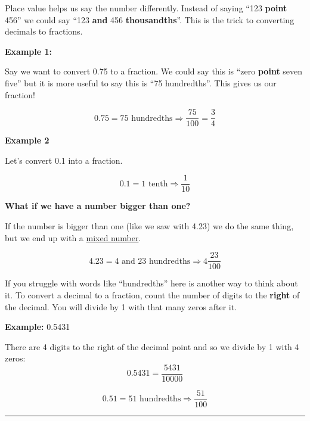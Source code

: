 \documentclass[
  letterpaper,
  DIV=11,
  numbers=noendperiod]{scrreprt}
\begin{document}
Place value helps us say the number differently. Instead of saying ``123
\textbf{point} 456'' we could say ``123 \textbf{and} 456
\textbf{thousandths}''. This is the trick to converting decimals to
fractions.

\textbf{Example 1:}

Say we want to convert 0.75 to a fraction. We could say this is ``zero
\textbf{point} seven five'' but it is more useful to say this is ``75
hundredths''. This gives us our fraction!

\[
0.75 = \text{75 hundredths} \Rightarrow \frac{75}{100} = \frac{3}{4}
\]

\textbf{Example 2}

Let's convert 0.1 into a fraction.

\[
0.1 = \text{1 tenth} \Rightarrow \frac{1}{10}
\]

\textbf{What if we have a number bigger than one?}

If the number is bigger than one (like we saw with 4.23) we do the same
thing, but we end up with a
\href{./glossary.html\#glossary-mixed-number}{mixed number}.

\[
4.23 = \text{4 and 23 hundredths} \Rightarrow 4\dfrac{23}{100}
\]

\begin{tcolorbox}[enhanced jigsaw, left=2mm, opacityback=0, colback=white, rightrule=.15mm, toptitle=1mm, colframe=quarto-callout-tip-color-frame, leftrule=.75mm, toprule=.15mm, breakable, bottomtitle=1mm, bottomrule=.15mm, colbacktitle=quarto-callout-tip-color!10!white, arc=.35mm, opacitybacktitle=0.6, titlerule=0mm, coltitle=black, title=\textcolor{quarto-callout-tip-color}{\faLightbulb}\hspace{0.5em}{Tip}]

If you struggle with words like ``hundredths'' here is another way to
think about it. To convert a decimal to a fraction, count the number of
digits to the \textbf{right} of the decimal. You will divide by 1 with
that many zeros after it.

\textbf{Example:} 0.5431

There are 4 digits to the right of the decimal point and so we divide by
1 with 4 zeros: \[
0.5431 = \frac{5431}{10000}
\]

\end{tcolorbox}

\[
0.51 = \text{51 hundredths} \Rightarrow \frac{51}{100}
\]

\begin{center}\rule{0.5\linewidth}{0.5pt}\end{center}
\end{document}
